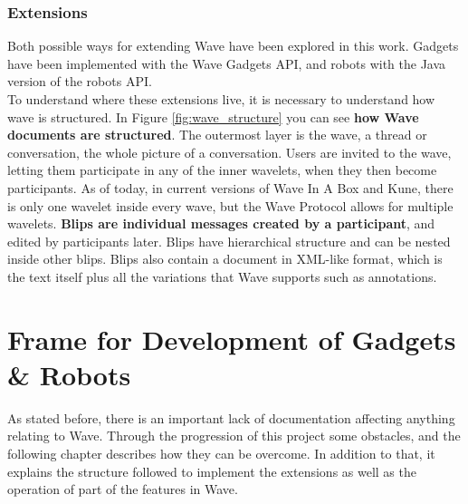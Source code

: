 \subsection{Extensions}
Both possible ways for extending Wave have been explored in this work. Gadgets have been implemented with the Wave Gadgets API, and robots with the Java version of the robots API.\\[.2cm]
To understand where these extensions live, it is necessary to understand how wave is structured. In Figure \ref{fig:wave_structure} you can see \textbf{how Wave documents are structured}. The outermost layer is the wave, a thread or conversation, the whole picture of a conversation. Users are invited to the wave, letting them participate in any of the inner wavelets, when they then become participants. As of today, in current versions of Wave In A Box and Kune, there is only one wavelet inside every wave, but the Wave Protocol allows for multiple wavelets. \textbf{Blips are individual messages created by a participant}, and edited by participants later. Blips have hierarchical structure and can be nested inside other blips. Blips also contain a document in XML-like format, which is the text itself plus all the variations that Wave supports such as annotations.

\chapter{Frame for Development of Gadgets \& Robots}
As stated before, there is an important lack of documentation affecting anything relating to Wave. Through the progression of this project some obstacles, and the following chapter describes how they can be overcome. In addition to that, it explains the structure followed to implement the extensions as well as the operation of part of the features in Wave.

